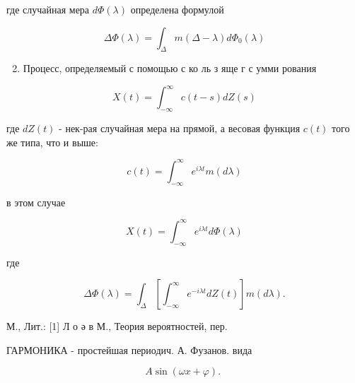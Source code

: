 \documentclass[10pt]{article}
\begin{document}
где случайная мера $d \Phi(\lambda)$ определена формулой



\[

\Delta \Phi(\lambda)=\int_{\Delta} m(\Delta-\lambda) d \Phi_{0}(\lambda)

\]



\begin{enumerate}

  \setcounter{enumi}{1}

  \item Процесс, определяемый с помощью с ко ль з яще г с умми рования

\end{enumerate}



\[

X(t)=\int_{-\infty}^{\infty} c(t-s) d Z(s)

\]



где $d Z(t)$ - нек-рая случайная мера на прямой, а весовая функция $c(t)$ того же типа, что и выше:



\[

c(t)=\int_{-\infty}^{\infty} e^{i \lambda t} m(d \lambda)

\]



в этом случае



\[

X(t)=\int_{-\infty}^{\infty} e^{i \lambda t} d \Phi(\lambda)

\]



где



\[

\Delta \Phi(\lambda)=\int_{\Delta}\left[\int_{-\infty}^{\infty} e^{-i \lambda t} d Z(t)\right] m(d \lambda) .

\]



М., Лит.: [1] Л о ә в М., Теория вероятностей, пер.



ГАРМОНИКА - простейшая периодич. А. Фузанов. вида



\[

A \sin (\omega x+\varphi) \text {. }

\]
\end{document}
